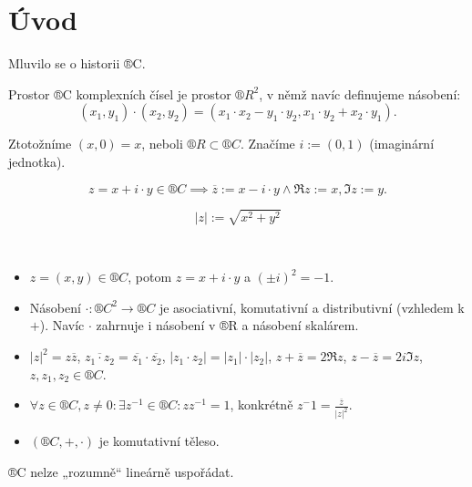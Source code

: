 \documentclass[12pt]{article}					%
\begin{document}
\section*{Úvod}

\begin{poznamka}
	Mluvilo se o historii ®C.
\end{poznamka}

\begin{definice}[Prostor ®C]
	Prostor ®C komplexních čísel je prostor $®R^2$, v němž navíc definujeme násobení:
	$$ (x_1, y_1) \cdot (x_2, y_2) = (x_1·x_2 - y_1·y_2, x_1·y_2 + x_2·y_1). $$

	Ztotožníme $(x, 0) = x$, neboli $®R \subset ®C$. Značíme $i := (0, 1)$ (imaginární jednotka).
\end{definice}

\begin{definice}
	$$ z = x + i·y \in ®C \implies \overline{z}:= x - i·y \land \Re z := x, \Im z := y. $$
\end{definice}

\begin{definice}
	$$ |z| := \sqrt{x^2 + y^2} $$
\end{definice}

\begin{tvrzeni}[Vlastnosti]
	\ 
	\begin{itemize}
		\item $z = (x, y) \in ®C$, potom $z = x + i·y$ a $(±i)^2 = -1$.
		\item Násobení $·: ®C^2 \rightarrow ®C$ je asociativní, komutativní a distributivní (vzhledem k $+$). Navíc $·$ zahrnuje i násobení v ®R a násobení skalárem.
		\item $|z|^2 = z \overline{z}$, $\overline{z_1 · z_2} = \overline{z_1}·\overline{z_2}$, $|z_1·z_2| = |z_1|·|z_2|$, $z + \overline{z} = 2 \Re z$, $z - \overline{z} = 2i\Im z$, $z, z_1, z_2 \in ®C$.
		\item $\forall z \in ®C, z ≠ 0: \exists z^{-1} \in ®C: z z^{-1} = 1$, konkrétně $z^-1 = \frac{\overline{z}}{|z|^2}$.
		\item $(®C, +, ·)$ je komutativní těleso.
	\end{itemize}
\end{tvrzeni}

\begin{upozorneni}
	®C nelze „rozumně“ lineárně uspořádat.
\end{upozorneni}
\end{document}
